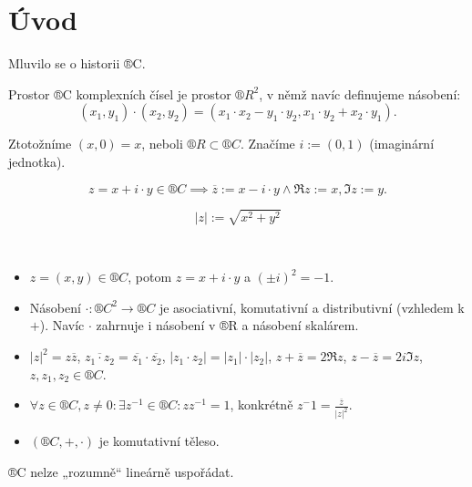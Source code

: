 \documentclass[12pt]{article}					%
\begin{document}
\section*{Úvod}

\begin{poznamka}
	Mluvilo se o historii ®C.
\end{poznamka}

\begin{definice}[Prostor ®C]
	Prostor ®C komplexních čísel je prostor $®R^2$, v němž navíc definujeme násobení:
	$$ (x_1, y_1) \cdot (x_2, y_2) = (x_1·x_2 - y_1·y_2, x_1·y_2 + x_2·y_1). $$

	Ztotožníme $(x, 0) = x$, neboli $®R \subset ®C$. Značíme $i := (0, 1)$ (imaginární jednotka).
\end{definice}

\begin{definice}
	$$ z = x + i·y \in ®C \implies \overline{z}:= x - i·y \land \Re z := x, \Im z := y. $$
\end{definice}

\begin{definice}
	$$ |z| := \sqrt{x^2 + y^2} $$
\end{definice}

\begin{tvrzeni}[Vlastnosti]
	\ 
	\begin{itemize}
		\item $z = (x, y) \in ®C$, potom $z = x + i·y$ a $(±i)^2 = -1$.
		\item Násobení $·: ®C^2 \rightarrow ®C$ je asociativní, komutativní a distributivní (vzhledem k $+$). Navíc $·$ zahrnuje i násobení v ®R a násobení skalárem.
		\item $|z|^2 = z \overline{z}$, $\overline{z_1 · z_2} = \overline{z_1}·\overline{z_2}$, $|z_1·z_2| = |z_1|·|z_2|$, $z + \overline{z} = 2 \Re z$, $z - \overline{z} = 2i\Im z$, $z, z_1, z_2 \in ®C$.
		\item $\forall z \in ®C, z ≠ 0: \exists z^{-1} \in ®C: z z^{-1} = 1$, konkrétně $z^-1 = \frac{\overline{z}}{|z|^2}$.
		\item $(®C, +, ·)$ je komutativní těleso.
	\end{itemize}
\end{tvrzeni}

\begin{upozorneni}
	®C nelze „rozumně“ lineárně uspořádat.
\end{upozorneni}
\end{document}
